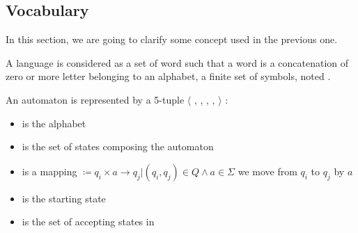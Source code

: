 \subsection{Vocabulary}
In this section, we are going to clarify some concept used in the previous one.

A language \lang{} is considered as a set of word \word{} such that a word is a concatenation of zero or more letter belonging to an alphabet, a finite set of symbols, noted \alphabet{}.

An automaton \automaton{} is represented by a 5-tuple $\langle$ \alphabet{}, \states{}, \transition{}, \qzero{}, \qend{} $\rangle$ :
\begin{itemize}
  \item \alphabet{} is the alphabet
  \item \states{} is the set of states composing the automaton
  \item \transition{} is a mapping \transition{} $\coloneqq {q_i \times a \rightarrow q_j | (q_i, q_j) \in Q \wedge a \in \Sigma } $ we move from $ q_i $ to $q_j$ by $a$
  \item \qzero{} is the starting state
  \item \qend{} is the set of accepting states in \states{}
\end{itemize}